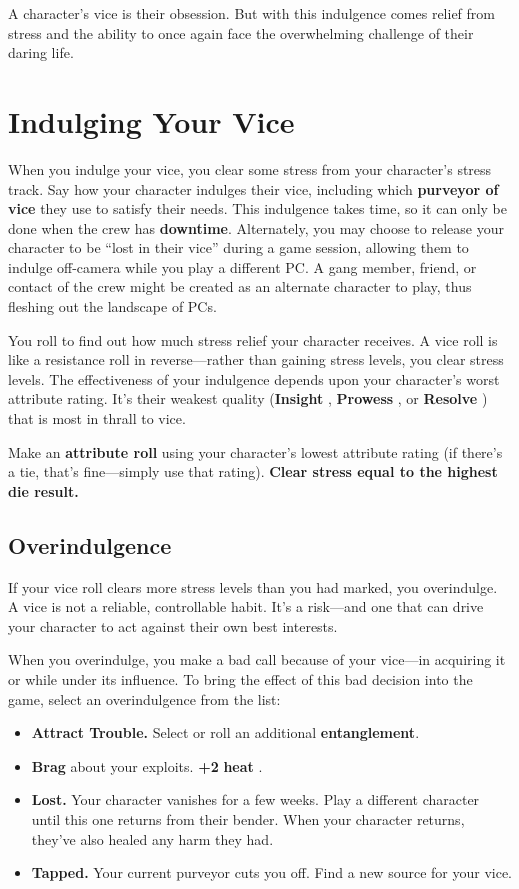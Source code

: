 \documentclass[11pt,oneside]{book}
\newcommand{\gameterm}[1]{\textbf{#1}}
\begin{document}
A character’s vice is their obsession. But with this indulgence comes relief from stress and the ability to once again face the overwhelming challenge of their daring life.

\section{Indulging Your Vice}

When you indulge your vice, you clear some stress from your character’s stress track. Say how your character indulges their vice, including which \textbf{purveyor of vice} they use to satisfy their needs.  This indulgence takes time, so it can only be done when the crew has \textbf{downtime}. Alternately, you may choose to release your character to be “lost in their vice” during a game session, allowing them to indulge off-camera while you play a different PC. A gang member, friend, or contact of the crew might be created as an alternate character to play, thus fleshing out the landscape of PCs.

You roll to find out how much stress relief your character receives. A vice roll is like a resistance roll in reverse---rather than gaining stress levels, you clear stress levels. The effectiveness of your indulgence depends upon your character’s worst attribute rating. It’s their weakest quality (\gameterm{Insight} , \gameterm{Prowess} , or \gameterm{Resolve} ) that is most in thrall to vice.

Make an \textbf{attribute roll} using your character’s lowest attribute rating (if there’s a tie, that’s fine---simply use that rating). \textbf{Clear stress equal to the highest die result.}

\subsection{Overindulgence}

If your vice roll clears more stress levels than you had marked, you overindulge. A vice is not a reliable, controllable habit. It’s a risk---and one that can drive your character to act against their own best interests.

When you overindulge, you make a bad call because of your vice---in acquiring it or while under its influence. To bring the effect of this bad decision into the game, select an overindulgence from the list:

\begin{itemize}
	\item \gameterm{Attract Trouble.}  Select or roll an additional \textbf{entanglement}.
	\item \gameterm{Brag}  about your exploits. \textbf{+2} \gameterm{heat} .
	\item \gameterm{Lost.}  Your character vanishes for a few weeks. Play a different character until this one returns from their bender. When your character returns, they’ve also healed any harm they had.
	\item \gameterm{Tapped.}  Your current purveyor cuts you off. Find a new source for your vice.
\end{itemize}
\end{document}
